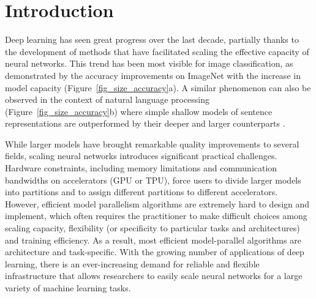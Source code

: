\documentclass{article}
\begin{document}
\section{Introduction}

Deep learning has seen great progress over the last decade, partially thanks to the development of methods that have facilitated scaling the effective capacity of neural networks. This trend has been most visible for image classification, as demonstrated by the accuracy improvements on ImageNet with the increase in model capacity (Figure~\ref{fig_size_accuracy}a). A similar phenomenon can also be observed in the context of natural language processing (Figure~\ref{fig_size_accuracy}b) where simple shallow models of sentence representations \cite{DBLP:journals/corr/abs-1708-00107,peters-etal-2018-deep} are outperformed by their deeper and larger counterparts \cite{Devlin2018bert,radford2019language}. 

While larger models have brought remarkable quality improvements to several fields, scaling neural networks introduces significant practical challenges. Hardware constraints, including memory limitations and communication bandwidths on accelerators (GPU or TPU), force users to divide larger models into partitions and to assign different partitions to different accelerators. However, efficient model parallelism algorithms are extremely hard to design and implement, which often requires the practitioner to make difficult choices among scaling capacity, flexibility (or specificity to particular tasks and architectures) and training efficiency. As a result, most efficient model-parallel algorithms are architecture and task-specific. With the growing number of applications of deep learning, there is an ever-increasing demand for reliable and flexible infrastructure that allows researchers to easily scale neural networks for a large variety of machine learning tasks.
\end{document}

